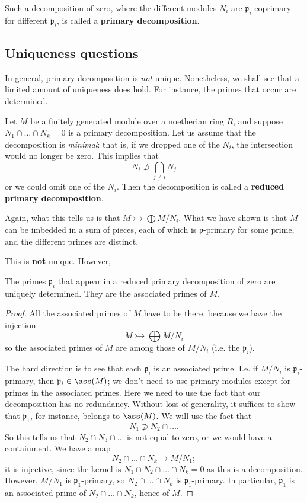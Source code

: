\begin{definition} 
Such a decomposition of zero, where the different modules $N_i$ are
$\mathfrak{p}_i$-coprimary for different $\mathfrak{p}_i$, is called a \textbf{primary decomposition}.
\end{definition} 



\subsection{Uniqueness questions}

In general, primary decomposition is \emph{not} unique. Nonetheless, we shall
see that a limited amount of uniqueness does hold. For instance, the primes
that occur are determined.

Let $M$ be a finitely generated module over a noetherian ring $R$, and suppose
$N_1 \cap \dots \cap N_k = 0$ is a primary decomposition.
Let us assume that the decomposition is
\emph{minimal}: that is, if we dropped one of the $N_i$, the intersection would no
longer be zero.
This implies that
\[ N_i \not\supset \bigcap_{j \neq i} N_j  \]
or we could omit one of the $N_i$. Then the decomposition is called a \textbf{reduced primary decomposition}.

Again, what this tells us is that $M \rightarrowtail  \bigoplus M/N_i$. What we
have shown is that $M$ can be imbedded in a sum of pieces, each of which is
$\mathfrak{p}$-primary for some prime, and the different primes are distinct.

This is \textbf{not} unique. However, 

\begin{proposition} 
The primes $\mathfrak{p}_i$ that appear in a reduced primary decomposition of zero are
uniquely determined. They are the associated primes of $M$.
\end{proposition} 
\begin{proof} 
All the associated primes of $M$ have to be there, because we have the injection
\[ M \rightarrowtail  \bigoplus M/N_i  \]
so the associated primes of $M$ are among those of $M/N_i$ (i.e. the
$\mathfrak{p}_i$).

The hard direction is to see that each $\mathfrak{p}_i$ is an associated prime.
I.e. if $M/N_i$ is $\mathfrak{p}_i$-primary, then $\mathfrak{p}_i \in \ass(M)$;
we don't need to use primary modules except for primes in the associated primes. 
Here we need to use the fact that our decomposition has no redundancy.  Without
loss of generality, it suffices to show that $\mathfrak{p}_1$, for instance,
belongs to $\ass(M)$. We will use the fact that
\[ N_1 \not\supset N_2 \cap \dots .  \]
So this tells us that $N_2 \cap N_3 \cap \dots$ is not equal to zero, or we
would have a containment. We have a map
\[ N_2 \cap \dots \cap N_k \to M/N_1;  \]
it is injective, since the kernel is $N_1 \cap N_2 \cap \dots \cap N_k = 0$ as
this is a decomposition.
However, $M/N_1$ is $\mathfrak{p}_1$-primary, so $N_2 \cap \dots \cap N_k$ is
$\mathfrak{p}_1$-primary. In particular, $\mathfrak{p}_1$ is an associated
prime of $N_2 \cap \dots \cap N_k$, hence of  $M$.
\end{proof} 

